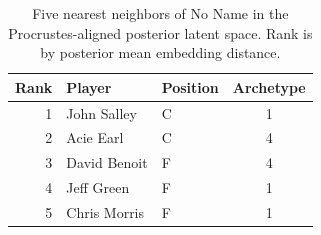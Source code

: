 \begin{table}[htbp]
  \centering\small
  \begin{tabular}{rllc}
    \toprule
    Rank & Player & Position & Archetype \\
    \midrule
    1 & John Salley & C & 1 \\
    2 & Acie Earl & C & 4 \\
    3 & David Benoit & F & 4 \\
    4 & Jeff Green & F & 1 \\
    5 & Chris Morris & F & 1 \\
    \bottomrule
  \end{tabular}
  \caption{Five nearest neighbors of No Name in the Procrustes-aligned posterior latent space. Rank is by posterior mean embedding distance.}
  \label{tab:No_Name_neighbors}
\end{table}

